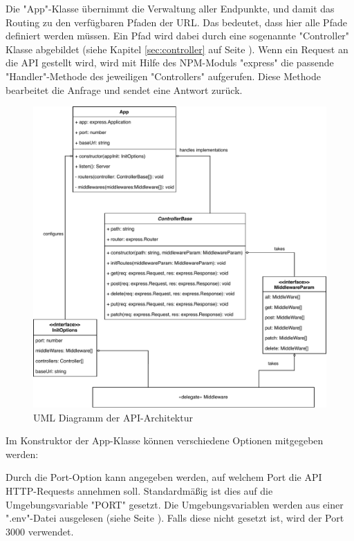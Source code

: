 \label{sec:app}

Die "App"-Klasse übernimmt die Verwaltung aller Endpunkte, und damit das Routing zu den verfügbaren Pfaden der URL.
Das bedeutet, dass hier alle Pfade definiert werden müssen. 
Ein Pfad wird dabei durch eine sogenannte "Controller" Klasse abgebildet (siehe Kapitel \ref{sec:controller} auf Seite \pageref{sec:controller}). 
Wenn ein Request an die API gestellt wird, wird mit Hilfe des NPM-Moduls "express" die passende "Handler"-Methode des jeweiligen "Controllers" aufgerufen. 
Diese Methode bearbeitet die Anfrage und sendet eine Antwort zurück.

\begin{figure}[H]
    \centering
    \includegraphics[width=\textwidth]{media/APITemplate/apiArchitecture.svg.pdf}
    \caption{UML Diagramm der API-Architektur}
    \label{fig:apiUML}
\end{figure}

\pagebreak

\label{sec:appConstructor}

Im Konstruktor der App-Klasse können verschiedene Optionen mitgegeben werden:


Durch die Port-Option kann angegeben werden, auf welchem Port die API HTTP-Requests annehmen soll. Standardmäßig ist dies auf die Umgebungsvariable "PORT" gesetzt. Die Umgebungsvariablen werden aus einer ".env"-Datei ausgelesen (siehe Seite \pageref{par:dockerEnvFile}). Falls diese nicht gesetzt ist, wird der Port 3000 verwendet.

